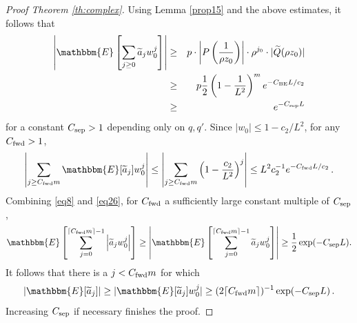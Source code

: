 \documentclass[final,12pt]{colt2018} %
\newcommand{\E}{\mathbbm{E}}
\newcommand{\1}{\mathbf{1}}
\newcommand{\eqb}{\begin{equation}}
\newcommand{\eqe}{\end{equation}}
\newcommand{\wt}{\widetilde}
\def\Qt{{\wt{Q}}}
\def\aat{{\wt{a}}}
\def\csep{C_{\rm sep}} %
\def\cfwd{C_{\rm fwd}} %
\def\cbe{C_{\rm BE}}
\begin{document}
\begin{proof}[Proof Theorem \ref{th:complex}]
	Using Lemma \ref{prop15} and the above estimates, it follows that
	\begin{eqnarray} \label{eq8}
	\left | \E \left [ \sum_{j\geq 0} \wt a_j w_0^j \right] \right |
	& \geq & p\cdot \left | P \left ( \frac{1}{\rho z_0} \right ) \right |
	\cdot  \rho^{j_0} \cdot|\Qt (\rho z_0)|\\
	& \geq & p \frac{1}{2} \left ( 1 - \frac{1}{L^2} \right )^m e^{- \cbe L/c_2}
	\nonumber \\
	& \geq & e^{- \csep L} \nonumber
	\end{eqnarray}
	for a constant $\csep > 1$ depending only on $q,q'$.
	Since $|w_0|\leq 1-c_2/L^2$, for any $\cfwd > 1$,
	\eqb
	\left|\sum_{j\geq \cfwd m} \E[\wt a_j] w_0^j\right|
	\leq
	\left | \sum_{j \geq \cfwd m} \left ( 1 - \frac{c_2}{L^2} \right )^j \right |
	\leq L^2 c_2^{-1} e^{- \cfwd L/c_2} \, .
	\label{eq26}
	\eqe
	Combining \eqref{eq8} and \eqref{eq26}, for $\cfwd$ a sufficiently large constant multiple of $\csep$,
	\eqb
	\begin{split}
		\E\left[ \sum_{j=0}^{\lceil \cfwd m\rceil-1} \left|\wt a_j w_0^j \right|\right]
		\geq
		\left|\E\left[ \sum_{j=0}^{\lceil \cfwd m\rceil-1} \wt a_j w_0^j \right]\right|
		\geq
		\frac 12 \exp(- \csep L).	
	\end{split}
	\eqe
	It follows that there is a $j < \cfwd m$ for which
	$$|\E[\aat_j]| \geq |\E[\aat_j] w_0^j| \geq (2 \lceil\cfwd m\rceil)^{-1}\exp(-\csep L) \, .$$
	Increasing $\csep$ if necessary finishes the proof.
\end{proof}



\end{document}
